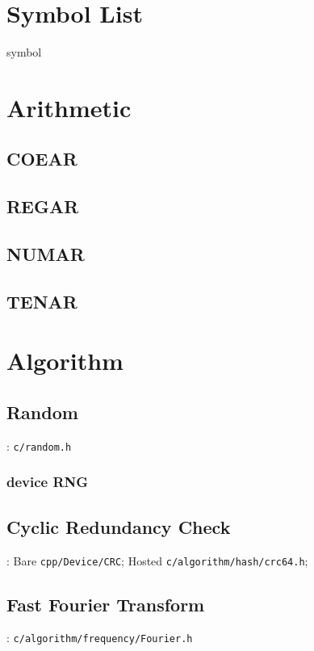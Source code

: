 
\section{Symbol List}
{symbol}

\section{Arithmetic}

\subsection{COEAR}
\subsection{REGAR}
\subsection{NUMAR}
\subsection{TENAR}

\section{Algorithm}

\subsection{Random}
: \verb`c/random.h`

\subsubsection{device RNG}

\subsection{Cyclic Redundancy Check}

:
Bare \verb`cpp/Device/CRC`;
Hosted \verb`c/algorithm/hash/crc64.h`;

\subsection{Fast Fourier Transform}

: \verb`c/algorithm/frequency/Fourier.h`


